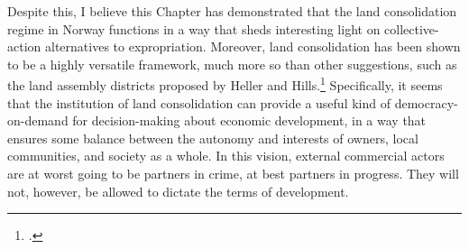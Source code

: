 Despite this, I believe this Chapter has demonstrated that the land consolidation regime in Norway functions in a way that sheds interesting light on collective-action alternatives to expropriation. Moreover, land consolidation has been shown to be a highly versatile framework, much more so than other suggestions, such as the land assembly districts proposed by Heller and Hills.\footcite{heller08} Specifically, it seems that the institution of land consolidation can provide a useful kind of democracy-on-demand for decision-making about economic development, in a way that ensures some balance between the autonomy and interests of owners, local communities, and society as a whole. In this vision, external commercial actors are at worst going to be partners in crime, at best partners in progress. They will not, however, be allowed to dictate the terms of development.


